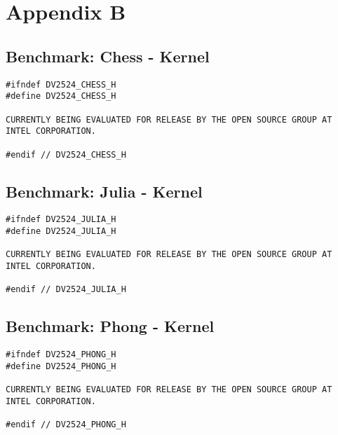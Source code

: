 
\chapter*{Appendix B}
\label{cha:appendixb}


\section*{Benchmark: Chess - Kernel}
\label{sec:appendixb_benchmarkchesskernel}
\begin{lstlisting}
#ifndef DV2524_CHESS_H
#define DV2524_CHESS_H

CURRENTLY BEING EVALUATED FOR RELEASE BY THE OPEN SOURCE GROUP AT INTEL CORPORATION.

#endif // DV2524_CHESS_H
\end{lstlisting}

\section*{Benchmark: Julia - Kernel}
\label{sec:appendixb_benchmarkjuliakernel}
\begin{lstlisting}
#ifndef DV2524_JULIA_H
#define DV2524_JULIA_H

CURRENTLY BEING EVALUATED FOR RELEASE BY THE OPEN SOURCE GROUP AT INTEL CORPORATION.

#endif // DV2524_JULIA_H
\end{lstlisting}

\section*{Benchmark: Phong - Kernel}
\label{sec:appendixb_benchmarkphongkernel}
\begin{lstlisting}
#ifndef DV2524_PHONG_H
#define DV2524_PHONG_H

CURRENTLY BEING EVALUATED FOR RELEASE BY THE OPEN SOURCE GROUP AT INTEL CORPORATION.

#endif // DV2524_PHONG_H
\end{lstlisting}
